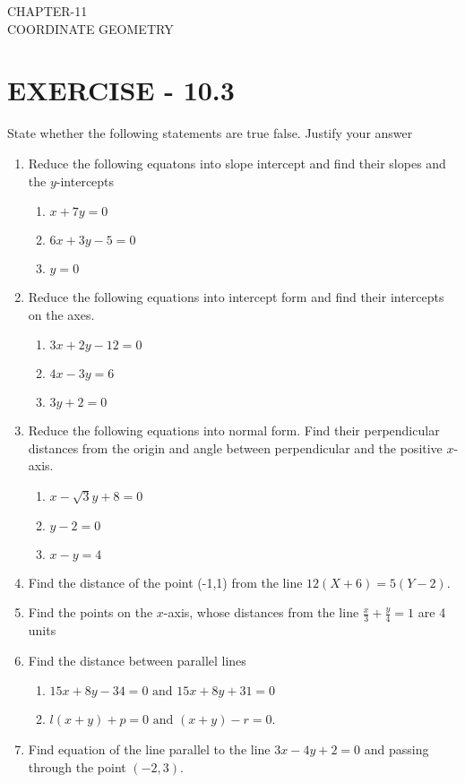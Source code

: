 \documentclass[12pt]{article}
\begin{document}
\begin{center}
\textbf\large{CHAPTER-11 \\ COORDINATE GEOMETRY}
\end{center}

\section*{EXERCISE - 10.3}
State whether the following statements are true false. Justify your answer
\begin{enumerate}
\item Reduce the following equatons into slope intercept and find their slopes and the $y$-intercepts 
\begin {enumerate}
\item $ x+7y=0 $
\item $ 6x+3y-5=0 $
\item $ y=0 $
\end{enumerate}
\item Reduce the following equations into intercept form and find their intercepts on the axes.
\begin {enumerate}
\item $ 3x+2y-12=0$
\item $ 4x-3y=6 $
\item $ 3y+2=0 $
\end {enumerate}
\item Reduce the following equations into normal form. Find their perpendicular distances from the origin and angle between perpendicular and the positive $x$-axis.
\begin {enumerate}
\item $ x-\sqrt{3}y+8=0 $
\item $ y-2=0 $
\item $ x-y=4 $
\end {enumerate}
\item Find the distance of the point (-1,1) from the line $ 12(X+6)= 5(Y-2)$.
\item Find the points on the $x$-axis, whose distances from the line $\frac{x}{3}+\frac{y}{4}=1 $ are 4 units
\item Find the distance between parallel lines 
\begin {enumerate}
\item $ 15x+8y-34=0 \text{ and }15x+8y+31=0 $
\item $ l (x+y)+p=0 \text{ and }(x+y)-r=0$.
\end{enumerate}
\item Find equation of the line parallel to the line $ 3x-4y+2=0 $ and passing through the point $(-2,3)$.

\end{enumerate}
\end{document}
